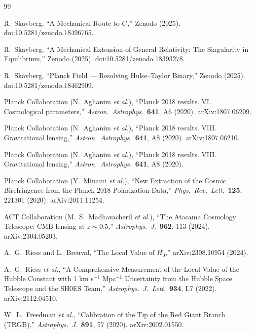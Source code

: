 \documentclass[11pt,a4paper]{article}
\theoremstyle{definition}
\begin{document}
\begin{thebibliography}{99}
\setlength{\itemsep}{2pt}

R.~Skavberg, ``A Mechanical Route to $G$,'' Zenodo (2025). doi:10.5281/zenodo.18496765.

R.~Skavberg, ``A Mechanical Extension of General Relativity: The Singularity in Equilibrium,'' Zenodo (2025). doi:10.5281/zenodo.18393278.

R.~Skavberg, ``Planck Field --- Resolving Hulse--Taylor Binary,'' Zenodo (2025). doi:10.5281/zenodo.18462909.

Planck Collaboration (N.~Aghanim \emph{et al.}), ``Planck 2018 results. VI. Cosmological parameters,'' \emph{Astron.\ Astrophys.}\ \textbf{641}, A6 (2020). arXiv:1807.06209.

Planck Collaboration (N.~Aghanim \emph{et al.}), ``Planck 2018 results. VIII. Gravitational lensing,'' \emph{Astron.\ Astrophys.}\ \textbf{641}, A8 (2020). arXiv:1807.06210.

Planck Collaboration (N.~Aghanim \emph{et al.}), ``Planck 2018 results. VIII. Gravitational lensing,'' \emph{Astron.\ Astrophys.}\ \textbf{641}, A8 (2020).

Planck Collaboration (Y.~Minami \emph{et al.}), ``New Extraction of the Cosmic Birefringence from the Planck 2018 Polarization Data,'' \emph{Phys.\ Rev.\ Lett.}\ \textbf{125}, 221301 (2020). arXiv:2011.11254.

ACT Collaboration (M.~S.~Madhavacheril \emph{et al.}), ``The Atacama Cosmology Telescope: CMB lensing at $z\sim 0.5$,'' \emph{Astrophys.\ J.}\ \textbf{962}, 113 (2024). arXiv:2304.05203.

A.~G.~Riess and L.~Breuval, ``The Local Value of $H_0$,'' arXiv:2308.10954 (2024).

A.~G.~Riess \emph{et al.}, ``A Comprehensive Measurement of the Local Value of the Hubble Constant with 1 km s$^{-1}$ Mpc$^{-1}$ Uncertainty from the Hubble Space Telescope and the SH0ES Team,'' \emph{Astrophys.\ J.\ Lett.}\ \textbf{934}, L7 (2022). arXiv:2112.04510.

W.~L.~Freedman \emph{et al.}, ``Calibration of the Tip of the Red Giant Branch (TRGB),'' \emph{Astrophys.\ J.}\ \textbf{891}, 57 (2020). arXiv:2002.01550.


\end{thebibliography}
\end{document}
